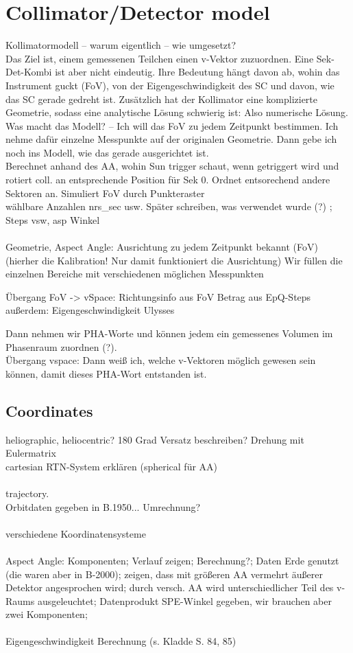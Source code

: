 %
%
%
\section{Collimator/Detector model}
Kollimatormodell -- warum eigentlich -- wie umgesetzt?
\\
Das Ziel ist, einem gemessenen Teilchen einen v-Vektor zuzuordnen. Eine Sek-Det-Kombi ist aber nicht eindeutig. Ihre Bedeutung hängt davon ab, wohin das Instrument guckt (FoV), von der Eigengeschwindigkeit des SC und davon, wie das SC gerade gedreht ist. Zusätzlich hat der Kollimator eine komplizierte Geometrie, sodass eine analytische Lösung schwierig ist: Also numerische Lösung.\\
Was macht das Modell? -- Ich will das FoV zu jedem Zeitpunkt bestimmen. Ich nehme dafür einzelne Messpunkte auf der originalen Geometrie. Dann gebe ich noch ins Modell, wie das gerade ausgerichtet ist.\\
Berechnet anhand des AA, wohin Sun trigger schaut, wenn getriggert wird und rotiert coll. an entsprechende Position für Sek 0. Ordnet entsorechend andere Sektoren an.
Simuliert FoV durch Punkteraster \\
wählbare Anzahlen nrs\_sec usw. Später schreiben, was verwendet wurde (?) ; Steps vsw, asp Winkel
\\ \\
Geometrie, Aspect Angle: Ausrichtung zu jedem Zeitpunkt bekannt
(FoV) (hierher die Kalibration! Nur damit funktioniert die Ausrichtung)
Wir füllen die einzelnen Bereiche mit verschiedenen möglichen Messpunkten

Übergang FoV -> vSpace:
Richtungsinfo aus FoV
Betrag aus EpQ-Steps
außerdem: Eigengeschwindigkeit Ulysses

Dann nehmen wir PHA-Worte und können jedem ein gemessenes Volumen im Phasenraum zuordnen (?).
\\
Übergang vspace: Dann weiß ich, welche v-Vektoren möglich gewesen sein können, damit dieses PHA-Wort entstanden ist.
%
\subsection{Coordinates}
heliographic, heliocentric? 180 Grad Versatz beschreiben? Drehung mit Eulermatrix\\
cartesian RTN-System erklären (spherical für AA)
\\ \\
trajectory. \\Orbitdaten gegeben in B.1950... Umrechnung?
\\ \\
verschiedene Koordinatensysteme
\\ \\
Aspect Angle: Komponenten; Verlauf zeigen; Berechnung?; Daten Erde genutzt (die waren aber in B-2000); zeigen, dass mit größeren AA vermehrt äußerer Detektor angesprochen wird; durch versch. AA wird unterschiedlicher Teil des v-Raums ausgeleuchtet; Datenprodukt SPE-Winkel gegeben, wir brauchen aber zwei Komponenten; 
\\ \\
Eigengeschwindigkeit Berechnung (s. Kladde S. 84, 85)






